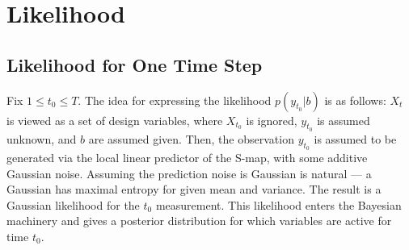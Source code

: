 \documentclass{article}
\theoremstyle{definition}
\begin{document}
\section{Likelihood}

\subsection{Likelihood for One Time Step}
Fix $1 \leq t_0 \leq T$. The idea for expressing the likelihood $p(
y_{t_0} | b )$ is as follows: $X_t$ is viewed as a set of design
variables, where $X_{t_0}$ is ignored, $y_{t_0}$ is assumed unknown,
and $b$ are assumed given. Then, the observation $y_{t_0}$ is assumed
to be generated via the local linear predictor of the S-map, with some
additive Gaussian noise. 
Assuming the prediction noise is Gaussian is natural --- a Gaussian has
maximal entropy for given mean and variance. The result is a Gaussian
likelihood for the $t_0$ measurement. This likelihood enters the
Bayesian machinery and gives a posterior distribution for which
variables are active for time $t_0$.
\end{document}
